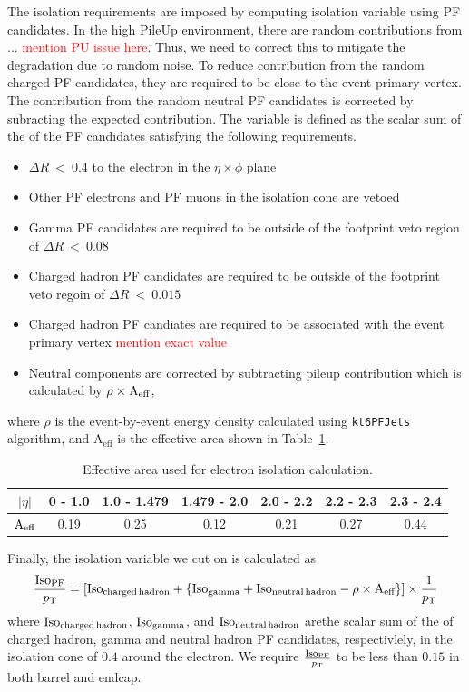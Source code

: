 The isolation requirements are imposed by computing isolation variable using 
PF candidates. In the high PileUp environment, there are random contributions 
from ... \textcolor{red}{mention PU issue here}.  
Thus, we need to correct this to mitigate the degradation due to random noise.
To reduce contribution from the random charged PF candidates, they are 
required to be close to the event primary vertex. The contribution from 
the random neutral PF candidates is corrected by subracting the expected contribution. 
The variable is defined as the scalar sum of the \pt{} of the 
PF candidates satisfying the following requirements. 
\begin{itemize}
\item $\Delta R~<~0.4$ to the electron in the $\eta \times \phi$ plane
\item Other PF electrons and PF muons in the isolation cone are vetoed
\item Gamma PF candidates are required to be outside of the footprint 
      veto region of $\Delta R~<~0.08$ 
\item Charged hadron PF candidates are required to be outside of the footprint 
      veto regoin of $\Delta R~<~0.015$ 
\item Charged hadron PF candiates are required to be associated with the event primary vertex
      \textcolor{red}{mention exact value} 
\item Neutral components are corrected by subtracting pileup contribution which is 
      calculated by $\rho \times \textrm{A}_{\rm{eff}}$,
\end{itemize}
where $\rho$ is the event-by-event energy density \cite{} calculated using 
\texttt{kt6PFJets} algorithm, 
and $\textrm{A}_{\textrm{eff}}$ is the effective area shown in Table~\ref{tab:electron_Aeff}. 
\begin{table}[!ht]
  \centering 
  \begin{tabular} {c||c|c|c|c|c|c}
  \hline
    $|\eta|$    & 0 - 1.0 & 1.0 - 1.479 & 1.479 - 2.0 & 2.0 - 2.2 & 2.2 - 2.3 & 2.3 - 2.4  \\
  \hline \hline
    $\textrm{A}_{\rm{eff}}$  & 0.19 & 0.25 & 0.12 & 0.21 & 0.27 & 0.44 \\ 
  \hline 
  \end{tabular}
  \caption{Effective area used for electron isolation calculation.}
  \label{tab:electron_Aeff}
\end{table}
Finally, the isolation variable we cut on is calculated as 
\begin{equation}
\frac{\rm{Iso}_{PF}}{p_\mathrm{T}}
=
\left[ \rm{Iso}_{charged \, hadron} + \left\{ \rm{Iso}_{gamma} 
       + \rm{Iso}_{neutral \, hadron} -\rho \times \textrm{A}_{\textrm{eff}} \right\} \right]
\times \frac{1}{p_\mathrm{T}}
\end{equation}
where $\rm{Iso}_{charged \, hadron}$, $\rm{Iso}_{gamma}$, and $\rm{Iso}_{neutral \, hadron}$ 
arethe scalar sum of the \pt{} of charged hadron, gamma and neutral hadron PF candidates, 
respectivlely, in the isolation cone of $0.4$ around the electron.
We require $\frac{\rm{Iso}_{PF}}{p_\mathrm{T}}$ to be less than $0.15$ in both barrel and endcap.  

